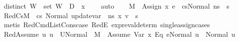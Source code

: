 \begin{isabellebody}
\ {\isachardoublequoteopen}distinct\ W{\isachardoublequoteclose}\ \ {\isachardoublequoteopen}set\ W\ {\isasyminter}\ {\isacharparenleft}{\kern0pt}D{}\ {\isasymunion}\ {\isacharbraceleft}{\kern0pt}x{}{\isacharbraceright}{\kern0pt}{\isacharparenright}{\kern0pt}\ {\isacharequal}{\kern0pt}\ {\isacharbraceleft}{\kern0pt}{\isacharbraceright}{\kern0pt}{\isachardoublequoteclose}\ \isamarkupfalse%
\ auto\isanewline
\ \ \isamarkupfalse%
\ {\isacartoucheopen}M{\isacharcomma}{\kern0pt}{\isasymLambda}{\isacharcomma}{\kern0pt}{\isasymGamma}{\isacharcomma}{\kern0pt}{\isasymOmega}\ {\isasymturnstile}\ {\isasymlangle}Assign\ x{}\ e{}\ {\isacharhash}{\kern0pt}\ cs{}{\isacharcomma}{\kern0pt}Normal\ ns{\isasymrangle}\ {\isacharbrackleft}{\kern0pt}{\isasymrightarrow}{\isacharbrackright}{\kern0pt}\ s{\isacharprime}{\kern0pt}{\isacartoucheclose}\ \isamarkupfalse%
\ RedCs{}{\isacharcolon}{\kern0pt}{\isacartoucheopen}M{\isacharcomma}{\kern0pt}{\isasymLambda}{\isacharcomma}{\kern0pt}{\isasymGamma}{\isacharcomma}{\kern0pt}{\isasymOmega}\ {\isasymturnstile}\ {\isasymlangle}cs{}{\isacharcomma}{\kern0pt}\ Normal\ {\isacharparenleft}{\kern0pt}update{\isacharunderscore}{\kern0pt}var\ {\isasymLambda}\ ns\ x{}\ v{}{\isacharparenright}{\kern0pt}{\isasymrangle}\ {\isacharbrackleft}{\kern0pt}{\isasymrightarrow}{\isacharbrackright}{\kern0pt}\ s{\isacharprime}{\kern0pt}{\isacartoucheclose}\isanewline
\ \ \ \ \isamarkupfalse%
\ {\isacharparenleft}{\kern0pt}metis\ RedCmdListCons{\isacharunderscore}{\kern0pt}case\ RedE{}\ expr{\isacharunderscore}{\kern0pt}eval{\isacharunderscore}{\kern0pt}determ{\isacharparenleft}{\kern0pt}{}{\isacharparenright}{\kern0pt}\ single{\isacharunderscore}{\kern0pt}assign{\isacharunderscore}{\kern0pt}cases{\isacharparenright}{\kern0pt}\isanewline
\ \ \isamarkupfalse%
\ RedAssume{\isacharcolon}{\kern0pt}\ {\isachardoublequoteopen}{\isasymAnd}u{\isachardot}{\kern0pt}\ u\ {\isasymin}\ {\isacharquery}{\kern0pt}U{}Normal\ {\isasymLongrightarrow}\ M{\isacharcomma}{\kern0pt}{\isasymLambda}{\isacharprime}{\kern0pt}{\isacharcomma}{\kern0pt}{\isasymGamma}{\isacharcomma}{\kern0pt}{\isasymOmega}\ {\isasymturnstile}\ {\isasymlangle}Assume\ {\isacharparenleft}{\kern0pt}{\isacharparenleft}{\kern0pt}Var\ x{}{\isacharparenright}{\kern0pt}\ {\isasymguillemotleft}Eq{\isasymguillemotright}\ e{}{\isacharparenright}{\kern0pt}{\isacharcomma}{\kern0pt}Normal\ u{\isasymrangle}\ {\isasymrightarrow}\ Normal\ u{\isachardoublequoteclose}\ \ \ \ \isanewline

\end{isabellebody}
